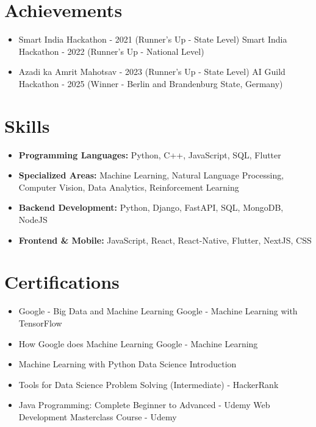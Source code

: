 \documentclass[a4paper,10pt]{article}
\begin{document}
\section*{Achievements}
\begin{itemize}
\item Smart India Hackathon - 2021 (Runner's Up - State Level) \hfill Smart India Hackathon - 2022 (Runner's Up - National Level)
\item Azadi ka Amrit Mahotsav - 2023 (Runner's Up - State Level) \hfill AI Guild Hackathon - 2025 (Winner - Berlin and Brandenburg State, Germany)
\end{itemize}

\section*{Skills}
\begin{itemize}
  \item \textbf{Programming Languages:} Python, C++, JavaScript, SQL, Flutter
  \item \textbf{Specialized Areas:} Machine Learning, Natural Language Processing, Computer Vision, Data Analytics, Reinforcement Learning
  \item \textbf{Backend Development:} Python, Django, FastAPI, SQL, MongoDB, NodeJS
  \item \textbf{Frontend \& Mobile:} JavaScript, React, React-Native, Flutter, NextJS, CSS
\end{itemize}

\section*{Certifications}
\begin{itemize}
\item Google - Big Data and Machine Learning \hfill Google - Machine Learning with TensorFlow
\item How Google does Machine Learning \hfill Google - Machine Learning
\item Machine Learning with Python \hfill Data Science Introduction
\item Tools for Data Science \hfill Problem Solving (Intermediate) - HackerRank
\item Java Programming: Complete Beginner to Advanced - Udemy \hfill Web Development Masterclass Course - Udemy
\end{itemize}
\end{document}
